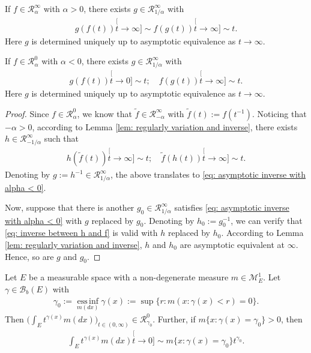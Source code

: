 \begin{lem} \label{lem: regularly variation and inverse}
	If $f \in \mathcal R_\alpha^\infty$ with $\alpha > 0$, there exists $g \in \mathcal R^\infty_{1/\alpha}$ with
\begin{align}
	g(f(t))
	\stackrel[t\to \infty]{}{\sim}
	f(g(t))
	\stackrel[t\to \infty]{}{\sim}
	t.
\end{align}
	Here $g$ is determined uniquely up to asymptotic equivalence as $t\to \infty$.
\end{lem}
\begin{cor} \label{cro: regularly varing and inverse with alpha < 0}
	If $f \in \mathcal R_\alpha^0$ with $\alpha < 0$, there exists $g \in \mathcal R^\infty_{1/\alpha}$ with
\begin{align} \label{eq: asymptotic inverse with alpha < 0}
	g(f(t))
	\stackrel[t\to 0]{}{\sim}
	t;
	\quad
	f(g(t))
	\stackrel[t\to \infty]{}{\sim}
	t.
\end{align}
	Here $g$ is determined uniquely up to asymptotic equivalence as $t\to \infty$.
\end{cor}
\begin{proof}
	Since $f \in \mathcal R_\alpha^0$, we know that $\tilde f \in \mathcal R_{-\alpha}^\infty$ with $\tilde f(t):= f(t^{-1})$.
	Noticing that $-\alpha > 0$, according to Lemma \ref{lem: regularly variation and inverse}, there exists $h \in \mathcal R_{-1/\alpha}^{\infty}$ such that
\begin{align} \label{eq: inverse between h and f}
	h(\tilde f(t))
	\stackrel[t\to \infty]{}{\sim}
	t;
	\quad
	\tilde f(h(t))
	\stackrel[t\to \infty]{}{\sim}
	t.
\end{align}
	Denoting by $g := h^{-1} \in \mathcal R_{1/\alpha}^\infty$, the above translates to \eqref{eq: asymptotic inverse with alpha < 0}.

	Now, suppose that there is another $g_0 \in \mathcal R_{1/\alpha}^\infty$ satisfies \eqref{eq: asymptotic inverse with alpha < 0} with $g$ replaced by $g_0$.
	Denoting by $h_0 := g_0^{-1}$, we can verify that \eqref{eq: inverse between h and f} is valid with $h$ replaced by $h_0$.
	According to Lemma \ref{lem: regularly variation and inverse}, $h$ and $h_0$ are asymptotic equivalent at $\infty$.
	Hence, so are $g$ and $g_0$.
\end{proof}

\begin{lem}\label{lem:regularly_variation_and_integration}
	Let $E$ be a measurable space with a non-degenerate measure $m \in \mathcal M^1_E$.
	Let $ \gamma \in \mathscr B_b(E)$ with
\begin{align}
	\gamma_0
	:= \operatorname*{ess\,inf}_{m(dx)} \gamma(x)
	:= \sup\{r:m(x:\gamma(x) < r) = 0\}.
\end{align}
	Then $\big(\int_E t^{\gamma(x)} m(dx)\big)_{t\in (0,\infty)} \in \mathcal R^0_{\gamma_0}$.
	Further, if $m\{x:\gamma(x) = \gamma_0\}>0$, then
\begin{align}
	\int_E t^{\gamma(x)} m(dx)
	\stackrel[t\to 0]{}{\sim}  m\{x:\gamma(x) = \gamma_0\} t^{\gamma_0}.
\end{align}
\end{lem}

